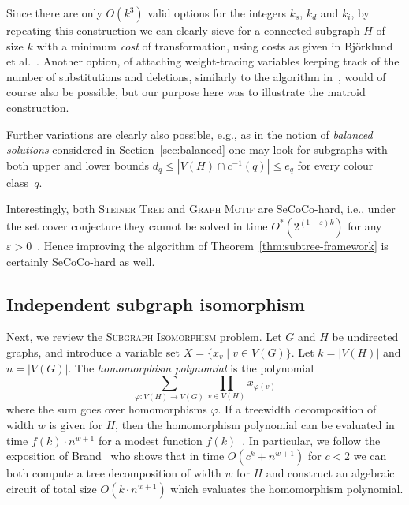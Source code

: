 \documentclass{theoretics}
\begin{document}
Since there are only $O(k^3)$ valid options for the integers $k_s$,
$k_d$ and $k_i$, by repeating this construction we can clearly sieve
for a connected subgraph $H$ of size $k$ with a minimum \emph{cost}
of transformation, using costs as given in Björklund et al.~\cite{BjorklundKK16}.
Another option, of attaching weight-tracing variables keeping track of the
number of substitutions and deletions, similarly to the algorithm in~\cite{BjorklundKK16},
would of course also be possible, but our purpose here was to
illustrate the matroid construction.

Further variations are clearly also possible, e.g., as in the notion
of \emph{balanced solutions} considered in Section~\ref{sec:balanced}
one may look for subgraphs with both upper and lower bounds 
$d_q \leq |V(H) \cap c^{-1}(q)| \leq e_q$ for every colour class~$q$. 

Interestingly, both \textsc{Steiner Tree} and \textsc{Graph Motif}
are SeCoCo-hard, i.e., under the set cover conjecture they cannot be
solved in time $O^*(2^{(1-\varepsilon)k})$ for any $\varepsilon > 0$~\cite{CyganDLMNOPSW16seth}.
Hence improving the algorithm of Theorem~\ref{thm:subtree-framework} is certainly SeCoCo-hard as well. 

\subsection{Independent subgraph isomorphism}
\label{subsec:subgraphiso}
Next, we review the \textsc{Subgraph Isomorphism} problem.
Let $G$ and $H$ be undirected graphs, and introduce a variable set $X=\{x_v \mid v \in V(G)\}$. 
Let $k=|V(H)|$ and $n=|V(G)|$. The \emph{homomorphism polynomial}
is the polynomial
\[
  \sum_{\varphi \colon V(H) \to V(G)}  \prod_{v \in V(H)} x_{\varphi(v)}
\]
where the sum goes over homomorphisms $\varphi$.
If a treewidth decomposition of width $w$ is given for $H$,
then the homomorphism polynomial can be evaluated
in time $f(k) \cdot n^{w+1}$ for a modest function $f(k)$~\cite{FominLRSR12}.
In particular, we follow the exposition of Brand~\cite{Brand19thesis}
who shows that in time $O(c^k+n^{w+1})$ for $c<2$ we can both compute a tree
decomposition of width $w$ for $H$ and construct an algebraic circuit
of total size $O(k \cdot n^{w+1})$ which evaluates the homomorphism
polynomial.
\end{document}
